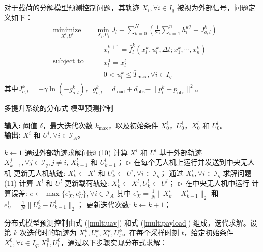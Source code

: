 \documentclass[lang=chs, degree=master, blindreview=false, winfonts=true]{yanputhesis}
\begin{document}
对于载荷的分解模型预测控制问题，其轨迹 $X_i, \forall i \in I_q$ 被视为外部信号，问题定义如下：
\begin{equation}
	\begin{aligned} 
	&\operatorname*{minimize}_{X^l, U^l}& & \min_{X_l, U_l} J_l + \sum_{k=0}^{N} \left( \frac{1}{2\gamma} \sum_{i=1}^{n} h_i^k{}^2 + J_{o,l}^k \right)\\
	&\text{subject to}& & \begin{aligned}
& x_l^{k+1} = \bar{f}_l^k(x_l^k, u_l^k, \Delta t; x_1^k, \cdots, x_n^k) \\
& x_l^0 = x_l^t\\
& 0 < u_l^k \leq \bar{T}_{\text{max}}, \forall i \in I_q		\end{aligned}	
\end{aligned}
\label{multipayload}
\end{equation}
其中$J_{o,l}^k = -\gamma \ln(-g_{o,l}^k)$，$g_{o,l}^k = d_{\text{load}} + d_{\text{obs}} - \|p_l^k - p_{\text{obs}}\|^2$。
\begin{algorithm}[h]
	\caption{多提升系统的分布式 模型预测控制}
	\label{alg:mpc_multilift}
	\textbf{输入:} 阈值 $\delta$，最大迭代次数 $k_{\text{max}}$，以及初始条件 $X^i_0$，$U^i_0$，$X^l_0$ 和 $U^l_0$。\\
	\textbf{输出:} $X^i$ 和 $U^i, \forall i \in \mathcal{I}_A$。
	
	\begin{algorithmic}[1]
	\State $k \gets 1$
			\State 通过外部轨迹求解问题 (10) 计算 $X^i$ 和 $U^i$
			\Statex \quad 基于外部轨迹 
			\Statex \quad $X^j_{k-1}, \forall j \in \mathcal{I}_q, j \neq i$, $X^l_{k-1}$ 和 $U^l_{k-1}$；
			\Statex \quad $\triangleright$ 在每个无人机上运行并发送到中央无人机
		\EndFor
		\State 更新无人机轨迹: $X^i_k \gets X^i$ 和 $U^i_k \gets U^i, \forall i \in \mathcal{I}_q$；
		\State 通过 $X^i_k, \forall i \in \mathcal{I}_q$ 求解问题 (11) 计算 $X^l$ 和 $U^l$
		\State 更新载荷轨迹: $X^l_k \gets X^l, U^l_k \gets U^l$；
		\Statex \quad $\triangleright$ 在中央无人机中运行
		\State 计算误差: $e \gets \max \{ e^i_X, e^i_U \}, \forall i \in \mathcal{I}_A$ 
		\Statex \quad 其中 $e^i_X = \frac{1}{N} \| X^i_k - X^i_{k-1} \|_2$ \textbf{和} 
		\Statex \quad $e^i_U = \frac{1}{N} \| U^i_k - U^i_{k-1} \|_2$；
		\State 更新迭代次数: $k \gets k + 1$；
	\EndWhile
	\end{algorithmic}
\end{algorithm}

分布式模型预测控制由式 (\ref{multiuav}) 和式 (\ref{multipayload}) 组成，迭代求解。设第 $k$ 次迭代时的轨迹为 $X_i^k, U_i^k, X_l^k, U_l^k$。在每个采样时刻 $t$，给定初始条件 $X_i^0, \forall i \in I_q, X_l^0, U_l^0$，通过以下步骤实现分布式求解：
\end{document}
